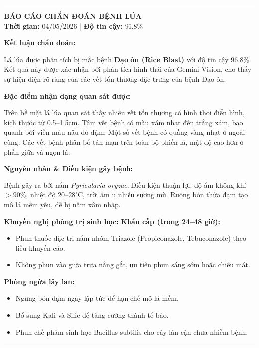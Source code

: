 \documentclass{uetgraduation}
\begin{document}
\vspace{0.5cm}
\noindent\rule{\textwidth}{0.8pt}
\begin{minipage}{\textwidth}
\vspace{0.3cm}
\textbf{\large BÁO CÁO CHẨN ĐOÁN BỆNH LÚA}\\
\textbf{Thời gian:} 04/05/2026 | \textbf{Độ tin cậy:} 96.8\%

\bigskip
\noindent\textbf{Kết luận chẩn đoán:}

Lá lúa được phân tích bị mắc bệnh \textbf{Đạo ôn (Rice Blast)} với độ tin cậy 96.8\%. Kết quả này được xác nhận bởi phân tích hình thái của Gemini Vision, cho thấy sự hiện diện rõ ràng của các vết tổn thương đặc trưng của bệnh Đạo ôn.

\bigskip
\noindent\textbf{Đặc điểm nhận dạng quan sát được:}

Trên bề mặt lá lúa quan sát thấy nhiều vết tổn thương có hình thoi điển hình, kích thước từ 0.5--1.5cm. Tâm vết bệnh có màu xám nhạt đến trắng xám, bao quanh bởi viền màu nâu đỏ đậm. Một số vết bệnh có quầng vàng nhạt ở ngoài cùng. Các vết bệnh phân bố tản mạn trên toàn bộ phiến lá, mật độ cao hơn ở phần giữa và ngọn lá.

\bigskip
\noindent\textbf{Nguyên nhân \& Điều kiện gây bệnh:}

Bệnh gây ra bởi nấm \textit{Pyricularia oryzae}. Điều kiện thuận lợi: độ ẩm không khí $>90\%$, nhiệt độ $20$--$28^\circ$C, trời âm u nhiều sương mù. Ruộng bón thừa đạm tạo mô lá mềm yếu, dễ bị nấm xâm nhập.

\bigskip
\noindent\textbf{Khuyến nghị phòng trị sinh học:}
\textbf{Khẩn cấp (trong 24--48 giờ):}
\begin{itemize}
    \item Phun thuốc đặc trị nấm nhóm Triazole (Propiconazole, Tebuconazole) theo liều khuyến cáo.
    \item Không phun vào giữa trưa nắng gắt, ưu tiên phun sáng sớm hoặc chiều mát.
\end{itemize}
\textbf{Phòng ngừa lây lan:}
\begin{itemize}
    \item Ngưng bón đạm ngay lập tức để hạn chế mô lá mềm.
    \item Bổ sung Kali và Silic để tăng cường thành tế bào.
    \item Phun chế phẩm sinh học Bacillus subtilis cho cây lân cận chưa nhiễm bệnh.
\end{itemize}
\vspace{0.3cm}
\end{minipage}
\noindent\rule{\textwidth}{0.8pt}
\end{document}

